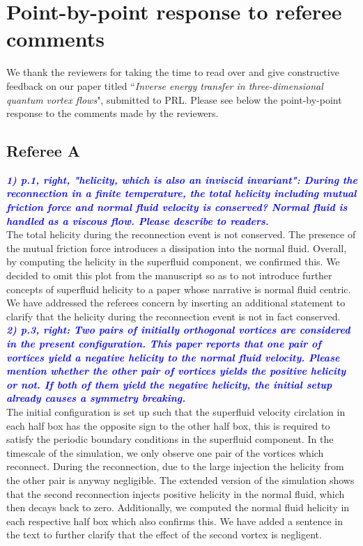 \documentclass[a4paper,10pt]{article}
\def\blue#1{\textcolor{blue}{#1}}
\def\refcomment#1{\textbf{\blue{\emph{#1}}}\\}
\begin{document}
\section*{\centering Point-by-point response to referee comments}

We thank the reviewers for taking the time to read over and give constructive feedback on our paper titled “\emph{Inverse energy transfer in three-dimensional quantum vortex flows}", submitted to PRL. Please see below the point-by-point response to the comments made by the reviewers.

\subsection*{Referee A}


    \refcomment{1) p.1, right, "helicity, which is also an inviscid invariant": During
    the reconnection in a finite temperature, the total helicity including
    mutual friction force and normal fluid velocity is conserved? Normal
    fluid is handled as a viscous flow. Please describe to readers.}

    The total helicity during the reconnection event is not conserved. The presence of the mutual friction force introduces a dissipation into the normal fluid. Overall, by computing the helicity in the superfluid component, we confirmed this. We decided to omit this plot from the manuscript so as to not introduce further concepts of superfluid helicity to a paper whose narrative is normal fluid centric. We have addressed the referees concern by inserting an additional statement to clarify that the helicity during the reconnection event is not in fact conserved. \\

    \refcomment{2) p.3, right: Two pairs of initially orthogonal vortices are
    considered in the present configuration. This paper reports that one
    pair of vortices yield a negative helicity to the normal fluid
    velocity. Please mention whether the other pair of vortices yields the
    positive helicity or not. If both of them yield the negative helicity,
    the initial setup already causes a symmetry breaking.}

    The initial configuration is set up such that the superfluid velocity circlation in each half box has the opposite sign to the other half box, this is required to satisfy the periodic boundary conditions in the superfluid component. In the timescale of the simulation, we only observe one pair of the vortices which reconnect. During the reconnection, due to the large injection the helicity from the other pair is anyway negligible. The extended version of the simulation shows that the second reconnection injects positive helicity in the normal fluid, which then decays back to zero. Additionally, we computed the normal fluid helicity in each respective half box which also confirms this. We have added a sentence in the text to further clarify that the effect of the second vortex is negligent. \\ 
    
\end{document}
